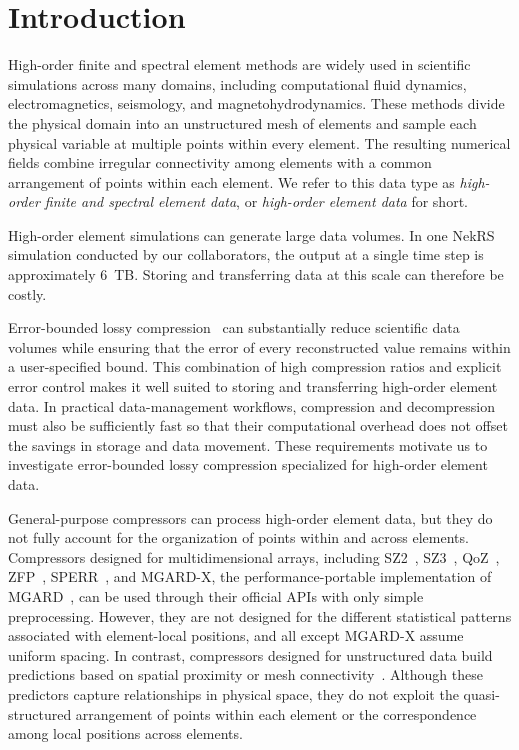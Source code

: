 \section{Introduction}

High-order finite and spectral element methods are widely used in scientific simulations across many domains, including computational fluid dynamics, electromagnetics, seismology, and magnetohydrodynamics. These methods divide the physical domain into an unstructured mesh of elements and sample each physical variable at multiple points within every element. The resulting numerical fields combine irregular connectivity among elements with a common arrangement of points within each element. We refer to this data type as \emph{high-order finite and spectral element data}, or \emph{high-order element data} for short.

High-order element simulations can generate large data volumes. In one NekRS~\cite{fischer2022nekrs} simulation conducted by our collaborators, the output at a single time step is approximately 6~TB. Storing and transferring data at this scale can therefore be costly.

Error-bounded lossy compression~\cite{liang2018error,liu2024high,zhao2021optimizing,liang2023sz3,lindstrom2014fixed,li2023lossy,di2025survey} can substantially reduce scientific data volumes while ensuring that the error of every reconstructed value remains within a user-specified bound. This combination of high compression ratios and explicit error control makes it well suited to storing and transferring high-order element data. In practical data-management workflows, compression and decompression must also be sufficiently fast so that their computational overhead does not offset the savings in storage and data movement. These requirements motivate us to investigate error-bounded lossy compression specialized for high-order element data.

General-purpose compressors can process high-order element data, but they do not fully account for the organization of points within and across elements. Compressors designed for multidimensional arrays, including SZ2~\cite{tao2017significantly}, SZ3~\cite{liang2023sz3,zhao2021optimizing}, QoZ~\cite{liu2024high}, ZFP~\cite{lindstrom2014fixed}, SPERR~\cite{li2023lossy}, and MGARD-X, the performance-portable implementation of MGARD~\cite{gong2023mgard}, can be used through their official APIs with only simple preprocessing. However, they are not designed for the different statistical patterns associated with element-local positions, and all except MGARD-X assume uniform spacing. In contrast, compressors designed for unstructured data build predictions based on spatial proximity or mesh connectivity~\cite{wu2025enabling,gong2024general,ren2024prediction}. Although these predictors capture relationships in physical space, they do not exploit the quasi-structured arrangement of points within each element or the correspondence among local positions across elements.


